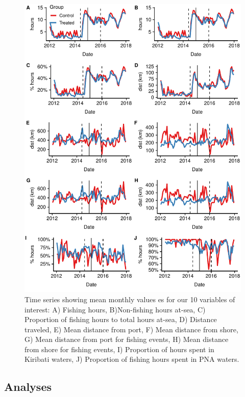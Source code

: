 \documentclass[9pttwoside,lineno]{pnas-new}
\begin{document}


\begin{figure}
\centering
\includegraphics{img/all_panels.pdf}
\caption{\label{fig:all_panels}Time series showing mean monthly values es for our 10 variables of interest:
A) Fishing hours, B)Non-fishing hours at-sea,
C) Proportion of fishing hours to total hours at-sea,
D) Distance traveled, E) Mean distance from port,
F) Mean distance from shore,
G) Mean distance from port for fishing events,
H) Mean distance from shore for fishing events,
I) Proportion of hours spent in Kiribati waters,
J) Proportion of fishing hours spent in PNA waters.}
\end{figure}

\clearpage

\subsection{Analyses}\label{analyses}
\end{document}

